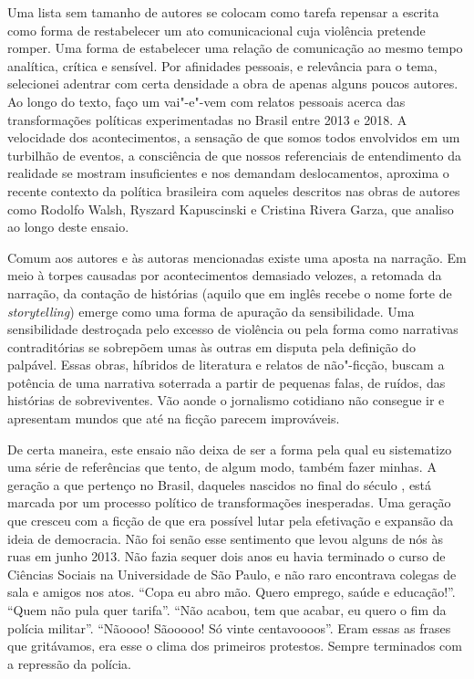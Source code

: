 Uma lista sem tamanho de autores se colocam como tarefa repensar a
escrita como forma de restabelecer um ato comunicacional cuja violência
pretende romper. Uma forma de estabelecer uma relação de comunicação ao
mesmo tempo analítica, crítica e sensível. Por afinidades pessoais, e
relevância para o tema, selecionei adentrar com certa densidade a obra
de apenas alguns poucos autores. Ao longo do texto, faço um vai"-e"-vem
com relatos pessoais acerca das transformações políticas experimentadas
no Brasil entre 2013 e 2018. A velocidade dos acontecimentos, a sensação
de que somos todos envolvidos em um turbilhão de eventos, a consciência
de que nossos referenciais de entendimento da realidade se mostram
insuficientes e nos demandam deslocamentos, aproxima o recente contexto
da política brasileira com aqueles descritos nas obras de autores como
Rodolfo Walsh, Ryszard Kapuscinski e Cristina Rivera Garza, que analiso
ao longo deste ensaio.

Comum aos autores e às autoras mencionadas existe uma aposta na
narração. Em meio à torpes causadas por acontecimentos demasiado
velozes, a retomada da narração, da contação de histórias (aquilo que em
inglês recebe o nome forte de \emph{storytelling}) emerge como uma forma
de apuração da sensibilidade. Uma sensibilidade destroçada pelo excesso
de violência ou pela forma como narrativas contraditórias se sobrepõem
umas às outras em disputa pela definição do palpável. Essas obras,
híbridos de literatura e relatos de não"-ficção, buscam a potência de uma
narrativa soterrada a partir de pequenas falas, de ruídos, das histórias
de sobreviventes. Vão aonde o jornalismo cotidiano não consegue ir e
apresentam mundos que até na ficção parecem improváveis.

\asterisc

De certa maneira, este ensaio não deixa de ser a forma pela qual eu
sistematizo uma série de referências que tento, de algum modo, também
fazer minhas. A geração a que pertenço no Brasil, daqueles nascidos no
final do século , está marcada por um processo político de
transformações inesperadas. Uma geração que cresceu com a ficção de que
era possível lutar pela efetivação e expansão da ideia de democracia.
Não foi senão esse sentimento que levou alguns de nós às ruas em junho
2013. Não fazia sequer dois anos eu havia terminado o curso de Ciências
Sociais na Universidade de São Paulo, e não raro encontrava colegas de
sala e amigos nos atos. ``Copa eu abro mão. Quero emprego, saúde e
educação!''. ``Quem não pula quer tarifa''. ``Não acabou, tem que
acabar, eu quero o fim da polícia militar''. ``Nãoooo! Sãooooo! Só vinte
centavoooos''. Eram essas as frases que gritávamos, era esse o clima dos
primeiros protestos. Sempre terminados com a repressão da polícia.

